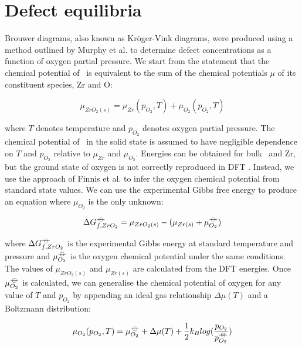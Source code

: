 \section{Defect equilibria}

Brouwer diagrams, also known as Kr{\"o}ger-Vink diagrams, were produced using a method outlined by Murphy et al. \cite{Murphy2014} to determine defect concentrations as a function of oxygen partial pressure. We start from the statement that the chemical potential of \zirconia\ is equivalent to the sum of the chemical potentials $\mu$ of its constituent species, Zr and O:

\begin{equation}
{\mu}_{ZrO_2(s)} = {\mu}_{Zr}(p_{O_2}, T) + {\mu}_{O_2}(p_{O_2}, T)
\label{mewZrO2compmethodology}
\end{equation}

where $T$ denotes temperature and $p_{O_2}$ denotes oxygen partial pressure. The chemical potential of \zirconia\ in the solid state is assumed to have negligible dependence on $T$ and $p_{O_2}$ relative to ${\mu}_{Zr}$ and ${\mu}_{O_2}$. Energies can be obtained for bulk \zirconia\ and Zr, but the ground state of oxygen is not correctly reproduced in DFT \cite{Batyrev2000,Lozovoi2001}. Instead, we use the approach of Finnis et al. \cite{Finnis2005} to infer the oxygen chemical potential from standard state values. We can use the experimental Gibbs free energy to produce an equation where $\mu_{O_2}$ is the only unknown:

\begin{equation}
\Delta{G^{{\ensuremath{-\kern-4pt{\ominus}\kern-4pt-}}}_{f, ZrO_2}} = \mu_{ZrO_2(s)} - (\mu_{Zr(s)} + \mu^{{-\kern-4pt{\ominus}\kern-4pt-}}_{O_2})
\end{equation}

where $\Delta{G^{{\ensuremath{-\kern-4pt{\ominus}\kern-4pt-}}}_{f, ZrO_2}}$ is the experimental Gibbs energy at standard temperature and pressure and $\mu^{{-\kern-4pt{\ominus}\kern-4pt-}}_{O_2}$ is the oxygen chemical potential under the same conditions. The values of $\mu_{ZrO_2(s)}$ and $\mu_{Zr(s)}$ are calculated from the DFT energies. Once $\mu^{{-\kern-4pt{\ominus}\kern-4pt-}}_{O_2}$ is calculated, we can generalise the chemical potential of oxygen for any value of $T$ and $p_{O_2}$ by appending an ideal gas relationship $\Delta{\mu(T)}$ and a Boltzmann distribution:

\begin{equation}
\mu_{O_2}(p_{O_2},T) = \mu^{{-\kern-4pt{\ominus}\kern-4pt-}}_{O_2} + \Delta{\mu(T)} + \frac{1}{2}{k_B}log(\frac{p_{O_2}}{p^{{-\kern-4pt{\ominus}\kern-4pt-}}_{O_2}})
\end{equation}

